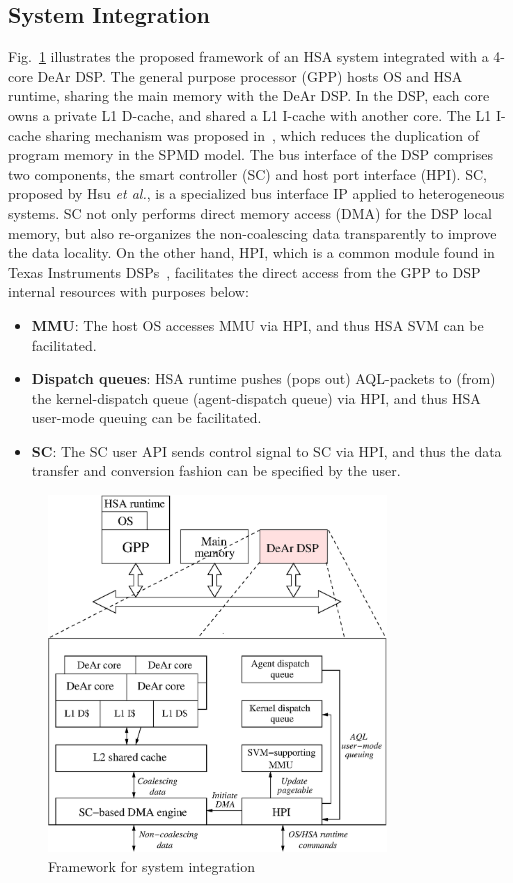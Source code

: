 \subsection{System Integration}
\label{sec:integration}
Fig.~\ref{fig:archi} illustrates the proposed framework of an HSA system integrated with a 4-core DeAr DSP.
The general purpose processor (GPP) hosts OS and HSA runtime, sharing the main memory with the DeAr DSP.
In the DSP, each core owns a private L1 D-cache, and shared a L1 I-cache with another core.
The L1 I-cache sharing mechanism was proposed in~\cite{kelly2004shared},
which reduces the duplication of program memory in the SPMD model.
The bus interface of the DSP comprises two components, the smart controller (SC) and host port interface (HPI).
SC, proposed by Hsu \textit{et al.}, is a specialized bus interface IP applied to heterogeneous systems.
SC not only performs direct memory access (DMA) for the DSP local memory,
but also re-organizes the non-coalescing data transparently to improve the data locality.
On the other hand, HPI, which is a common module found in Texas Instruments DSPs~\cite{hpi},
facilitates the direct access from the GPP to DSP internal resources with purposes below:
\begin{itemize}
    \item \textbf{MMU}: The host OS accesses MMU via HPI, and thus HSA SVM can be facilitated.
    \item \textbf{Dispatch queues}: HSA runtime pushes (pops out) AQL-packets to (from) the kernel-dispatch queue (agent-dispatch queue) via HPI, 
        and thus HSA user-mode queuing can be facilitated.
    \item \textbf{SC}: The SC user API sends control signal to SC via HPI, 
        and thus the data transfer and conversion fashion can be specified by the user.
\end{itemize}

\vspace{\textfig}
\begin{figure}[!ht] 
    \centering
    \includegraphics[width=0.8\textwidth]{./figs/archi.eps}
    \caption{Framework for system integration}
    \label{fig:archi}
\end{figure}

